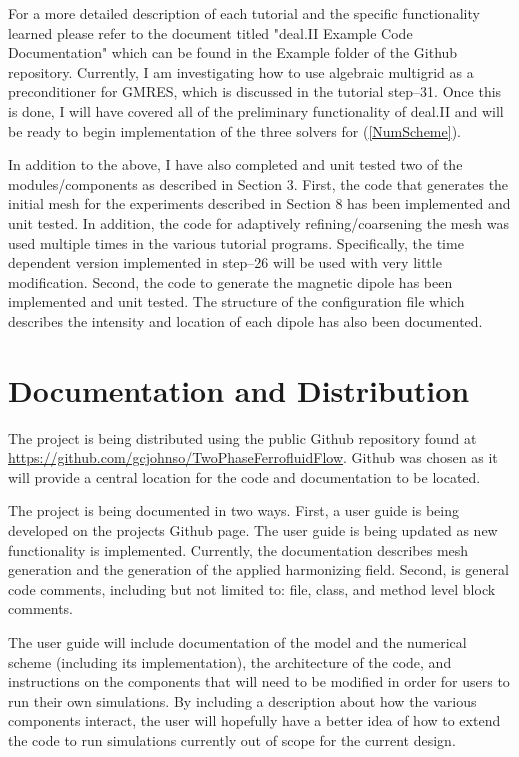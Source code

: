 \documentclass[11pt,fullpage]{article}
\theoremstyle{lemma}
\theoremstyle{definition}
\theoremstyle{lemma}
\begin{document}
For a more detailed description of each tutorial and the specific functionality learned please refer to the document titled "deal.II Example Code Documentation" which can be found in the Example folder of the Github repository. Currently, I am investigating how to use algebraic multigrid as a preconditioner for GMRES, which is discussed in the tutorial step--31. Once this is done, I will have covered all of the preliminary functionality of deal.II and will be ready to begin implementation of the three solvers for (\ref{NumScheme}).

In addition to the above, I have also completed and unit tested two of the modules/components as described in Section 3. First, the code that generates the initial mesh for the experiments described in Section 8 has been implemented and unit tested. In addition, the code for adaptively refining/coarsening the mesh was used multiple times in the various tutorial programs. Specifically, the time dependent version implemented in step--26 will be used with very little modification. Second, the code to generate the magnetic dipole has been implemented and unit tested. The structure of the configuration file which describes the intensity and location of each dipole has also been documented.

\section{Documentation and Distribution}
The project is being distributed using the public Github repository found at \url{https://github.com/gcjohnso/TwoPhaseFerrofluidFlow}. Github was chosen as it will provide a central location for the code and documentation to be located.

The project is being documented in two ways. First, a user guide is being developed on the projects Github page. The user guide is being updated as new functionality is implemented. Currently, the documentation describes mesh generation and the generation of the applied harmonizing field. Second, is general code comments, including but not limited to: file, class, and method level block comments. 

The user guide will include documentation of the model and the numerical scheme (including its implementation), the architecture of the code, and instructions on the components that will need to be modified in order for users to run their own simulations. By including a description about how the various components interact, the user will hopefully have a better idea of how to extend the code to run simulations currently out of scope for the current design.
\end{document}
